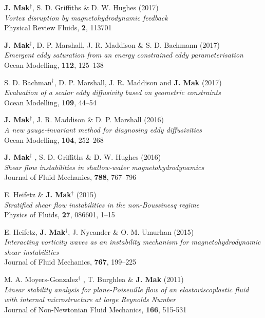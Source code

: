 \documentclass[letterpaper]{article}
\renewenvironment{itemize}{
  \begin{list}{}{
    \setlength{\leftmargin}{1.5em}
  }
}{
  \end{list}
}
\begin{document}
\begin{itemize}
\item[8.] \textbf{J. Mak}$^{\dagger}$, S. D. Griffiths \& D. W. Hughes
(2017)\\
\textit{Vortex disruption by magnetohydrodynamic feedback}\\
Physical Review Fluids, \textbf{2}, 113701

\item[7.] \textbf{J. Mak}$^{\dagger}$, D. P. Marshall, J. R. Maddison \& S. D. Bachmann
(2017)\\
\textit{Emergent eddy saturation from an energy constrained eddy parameterisation}\\
Ocean Modelling, \textbf{112}, 125--138

\item[6.] S. D. Bachman$^{\dagger}$, D. P. Marshall, J. R. Maddison and \textbf{J. Mak}
(2017)\\
\textit{Evaluation of a scalar eddy diffusivity based on geometric constraints}\\
Ocean Modelling, \textbf{109}, 44--54

\item[5.] \textbf{J. Mak}$^{\dagger}$, J. R. Maddison \& D. P. Marshall
(2016)\\
\textit{A new gauge-invariant method for diagnosing eddy diffusivities}\\
Ocean Modelling, \textbf{104}, 252--268

\item[4.] \textbf{J. Mak}$^{\dagger}$ , S. D. Griffiths \& D. W. Hughes
(2016)\\
\textit{Shear flow instabilities in shallow-water magnetohydrodynamics}\\
Journal of Fluid Mechanics, \textbf{788}, 767--796

\item[3.] E. Heifetz \& \textbf{J. Mak}$^{\dagger}$ (2015)\\
\textit{Stratified shear flow instabilities in the non-Boussinesq regime}\\
Physics of Fluids, \textbf{27}, 086601, 1--15

\item[2.] E. Heifetz, \textbf{J. Mak}$^{\dagger}$, J. Nycander \& O. M.
Umurhan (2015)\\
\textit{Interacting vorticity waves as an instability mechanism for
magnetohydrodynamic shear instabilities}\\
Journal of Fluid Mechanics, \textbf{767}, 199--225

\item[1.] M. A. Moyers-Gonzalez$^{\dagger}$ , T. Burghlea \& \textbf{J. Mak}
(2011)\\
\textit{Linear stability analysis for plane-Poiseuille flow of an
elastoviscoplastic fluid with internal microstructure at large Reynolds
Number}\\
Journal of Non-Newtonian Fluid Mechanics, \textbf{166}, 515-531
\end{itemize}
\end{document}
